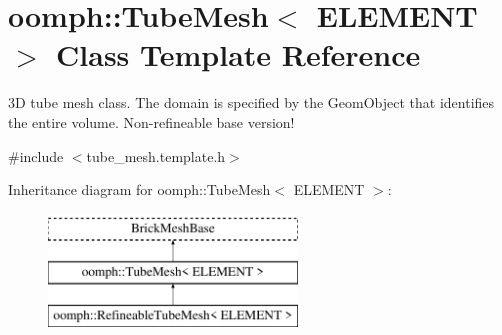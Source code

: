 \hypertarget{classoomph_1_1TubeMesh}{}\section{oomph\+:\+:Tube\+Mesh$<$ E\+L\+E\+M\+E\+NT $>$ Class Template Reference}
\label{classoomph_1_1TubeMesh}


3D tube mesh class. The domain is specified by the Geom\+Object that identifies the entire volume. Non-\/refineable base version!  




{\ttfamily \#include $<$tube\+\_\+mesh.\+template.\+h$>$}

Inheritance diagram for oomph\+:\+:Tube\+Mesh$<$ E\+L\+E\+M\+E\+NT $>$\+:\begin{figure}[H]
\begin{center}
\leavevmode
\includegraphics[height=3.000000cm]{classoomph_1_1TubeMesh}
\end{center}
\end{figure}
